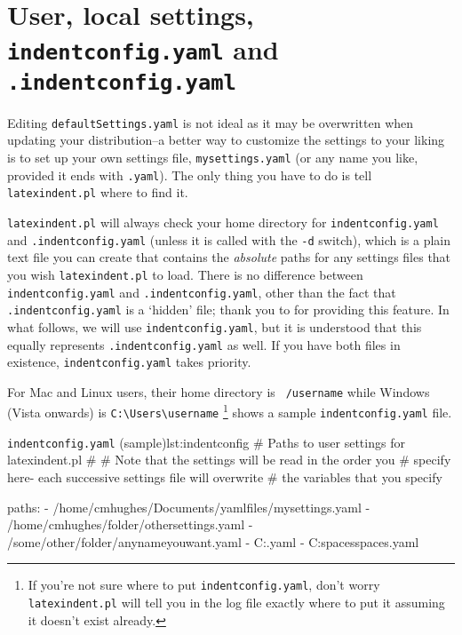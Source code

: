 \section{User, local settings, \texttt{indentconfig.yaml} and \texttt{.indentconfig.yaml}}\label{sec:indentconfig}
	Editing \texttt{defaultSettings.yaml} is not ideal as it may be overwritten when
	updating your distribution--a better way to customize the settings to your liking
	is to set up your own settings file,
	\texttt{mysettings.yaml} (or any name you like, provided it ends with \texttt{.yaml}).
	The only thing you have to do is tell \texttt{latexindent.pl} where to find it.

	\texttt{latexindent.pl} will always check your home directory for \texttt{indentconfig.yaml}
	and  \texttt{.indentconfig.yaml} (unless
	it is called with the \texttt{-d} switch),
	which is a plain text file you can create that contains the \emph{absolute}
	paths for any settings files that you wish \texttt{latexindent.pl} to load. There is no difference
	between \texttt{indentconfig.yaml} and \texttt{.indentconfig.yaml}, other than the
	fact that \texttt{.indentconfig.yaml} is a `hidden' file; thank you to \cite{jacobo-diaz-hidden-config}
	for providing this feature. In what follows, we will use \texttt{indentconfig.yaml}, but it
	is understood that this equally represents \texttt{.indentconfig.yaml} as well. If you
	have both files in existence,  \texttt{indentconfig.yaml} takes priority.

	For Mac and Linux users, their home directory is \texttt{~/username} while
	Windows (Vista onwards) is \lstinline!C:\Users\username! \footnote{If you're not sure
		where to put \texttt{indentconfig.yaml}, don't
		worry \texttt{latexindent.pl} will tell you in the log file exactly where to
		put it assuming it doesn't exist already.}
	 shows a sample \texttt{indentconfig.yaml} file.

	\begin{yaml}{\texttt{indentconfig.yaml} (sample)}{lst:indentconfig}
	# Paths to user settings for latexindent.pl
	#
	# Note that the settings will be read in the order you
	# specify here- each successive settings file will overwrite
	# the variables that you specify

	paths:
	- /home/cmhughes/Documents/yamlfiles/mysettings.yaml
	- /home/cmhughes/folder/othersettings.yaml
	- /some/other/folder/anynameyouwant.yaml
	- C:\Users\chughes\Documents\mysettings.yaml
	- C:\Users\chughes\Desktop\test spaces\more spaces.yaml
\end{yaml}

